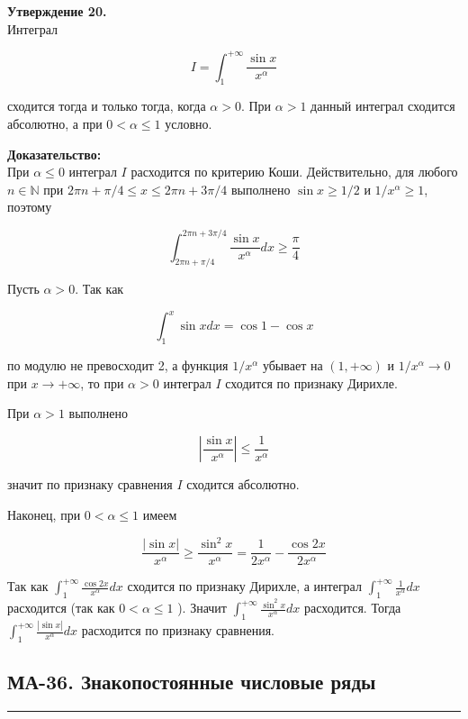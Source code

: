 \documentclass[a4paper,12pt]{article} %
\newcommand{\HRule}{\rule{\linewidth}{0.5mm}}
\begin{document}
	\textbf{Утверждение 20.}\\
	
	Интеграл
	
	$$
	I=\int_{1}^{+\infty} \frac{\sin x}{x^{\alpha}}
	$$
	
	сходится тогда и только тогда, когда $\alpha>0$. При $\alpha>1$ данный интеграл сходится абсолютно, а при $0<\alpha \leq 1$ условно.
	
	\textbf{Доказательство:\\}
	При $\alpha \leq 0$ интеграл $I$ расходится по критерию Коши. Действительно, для любого $n \in \mathbb{N}$ при $2 \pi n+\pi / 4 \leq x \leq 2 \pi n+3 \pi / 4$ выполнено $\sin x \geq 1 / 2$ и $1 / x^{\alpha} \geq 1$, поэтому
	
	$$
	\int_{2 \pi n+\pi / 4}^{2 \pi n+3 \pi / 4} \frac{\sin x}{x^{\alpha}} d x \geq \frac{\pi}{4}
	$$
	
	Пусть $\alpha>0$. Так как
	
	$$
	\int_{1}^{x} \sin x d x=\cos 1-\cos x
	$$
	
	по модулю не превосходит 2, а функция $1 / x^{\alpha}$ убывает на $(1,+\infty)$ и $1 / x^{\alpha} \rightarrow 0$ при $x \rightarrow+\infty$, то при $\alpha>0$ интеграл $I$ сходится по признаку Дирихле.
	
	При $\alpha>1$ выполнено
	
	$$
	\left|\frac{\sin x}{x^{\alpha}}\right| \leq \frac{1}{x^{\alpha}}
	$$
	
	значит по признаку сравнения $I$ сходится абсолютно.
	
	Наконец, при $0<\alpha \leq 1$ имеем
	
	$$
	\frac{|\sin x|}{x^{\alpha}} \geq \frac{\sin ^{2} x}{x^{\alpha}}=\frac{1}{2 x^{\alpha}}-\frac{\cos 2 x}{2 x^{\alpha}}
	$$
	
	Так как $\int_{1}^{+\infty} \frac{\cos 2 x}{x^{\alpha}} d x$ сходится по признаку Дирихле, а интеграл $\int_{1}^{+\infty} \frac{1}{x^{\alpha}} d x$ расходится (так как $0<\alpha \leq 1$ ). Значит $\int_{1}^{+\infty} \frac{\sin ^{2} x}{x^{\alpha}} d x$ расходится. Тогда $\int_{1}^{+\infty} \frac{|\sin x|}{x^{\alpha}} d x$ расходится по признаку сравнения.



	\newpage

	\begin{LARGE}
		\begin{center}
			\section{МА-36. Знакопостоянные числовые ряды}
		\end{center}
	\end{LARGE}
	\HRule \\
\end{document}
